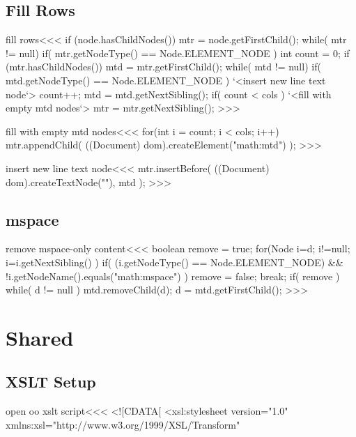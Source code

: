 \documentclass{article}
\begin{document}
\subsection{Fill Rows}





\<fill rows\><<<
if (node.hasChildNodes()) {
   mtr = node.getFirstChild();
   while( mtr != null){
      if( mtr.getNodeType() == Node.ELEMENT_NODE ){
         int count = 0;
         if (mtr.hasChildNodes()) {
           mtd = mtr.getFirstChild(); 
           while( mtd != null){
             if( mtd.getNodeType() == Node.ELEMENT_NODE ){
                `<insert new line text node`>
                count++;
             }  
             mtd = mtd.getNextSibling();
           }
         } 
         if( count < cols ){ 
            `<fill with empty mtd nodes`>
      }  }
      mtr = mtr.getNextSibling();
}  }  
>>>

\<fill with empty mtd nodes\><<<
for(int i = count; i < cols; i++){
  mtr.appendChild( ((Document) dom).createElement("math:mtd") );
}
>>>

\<insert new line text node\><<<
mtr.insertBefore( ((Document) dom).createTextNode("\n"), mtd );
>>>


\subsection{mspace}


\<remove mspace-only content\><<<
boolean remove = true;
for(Node i=d; i!=null; i=i.getNextSibling() ){
   if( (i.getNodeType() == Node.ELEMENT_NODE)  
       && !i.getNodeName().equals("math:mspace") ) {
      remove = false; break;
}  }
if( remove ){
   while( d != null ){
     mtd.removeChild(d); 
     d = mtd.getFirstChild();
}  }
>>>

\section{Shared}



\subsection{XSLT Setup}





\<open oo xslt script\><<<
<![CDATA[ 
   <xsl:stylesheet version="1.0"
      xmlns:xsl="http://www.w3.org/1999/XSL/Transform"
\end{document}
